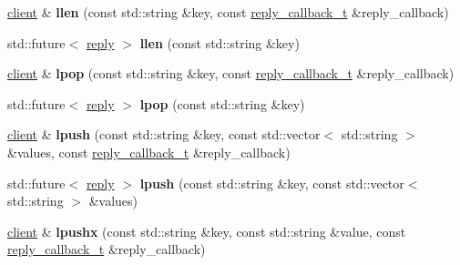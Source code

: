 \begin{DoxyCompactItemize}
\item 
\mbox{\label{classcpp__redis_1_1client_a2e0a911a6bb87224896b7c33da7ac058}} 
\hyperlink{classcpp__redis_1_1client}{client} \& {\bfseries llen} (const std\+::string \&key, const \hyperlink{classcpp__redis_1_1client_a061a1140d36d2eaeda82b09a0bb3f9f2}{reply\+\_\+callback\+\_\+t} \&reply\+\_\+callback)
\item 
\mbox{\label{classcpp__redis_1_1client_a2890fccb9efd08b38195c8fb5fd1651e}} 
std\+::future$<$ \hyperlink{classcpp__redis_1_1reply}{reply} $>$ {\bfseries llen} (const std\+::string \&key)
\item 
\mbox{\label{classcpp__redis_1_1client_ad4060807b9b9aa330ad11dedd69e80b8}} 
\hyperlink{classcpp__redis_1_1client}{client} \& {\bfseries lpop} (const std\+::string \&key, const \hyperlink{classcpp__redis_1_1client_a061a1140d36d2eaeda82b09a0bb3f9f2}{reply\+\_\+callback\+\_\+t} \&reply\+\_\+callback)
\item 
\mbox{\label{classcpp__redis_1_1client_ab6ebbc7b2e6f43f2b5607a4b5471694e}} 
std\+::future$<$ \hyperlink{classcpp__redis_1_1reply}{reply} $>$ {\bfseries lpop} (const std\+::string \&key)
\item 
\mbox{\label{classcpp__redis_1_1client_a0dd04ea38709dd51ae5f39de62d01c70}} 
\hyperlink{classcpp__redis_1_1client}{client} \& {\bfseries lpush} (const std\+::string \&key, const std\+::vector$<$ std\+::string $>$ \&values, const \hyperlink{classcpp__redis_1_1client_a061a1140d36d2eaeda82b09a0bb3f9f2}{reply\+\_\+callback\+\_\+t} \&reply\+\_\+callback)
\item 
\mbox{\label{classcpp__redis_1_1client_ac5859a6b63200a4a79574187a7155feb}} 
std\+::future$<$ \hyperlink{classcpp__redis_1_1reply}{reply} $>$ {\bfseries lpush} (const std\+::string \&key, const std\+::vector$<$ std\+::string $>$ \&values)
\item 
\mbox{\label{classcpp__redis_1_1client_ab0a9a2b92f53f774ce4e345b42a403d0}} 
\hyperlink{classcpp__redis_1_1client}{client} \& {\bfseries lpushx} (const std\+::string \&key, const std\+::string \&value, const \hyperlink{classcpp__redis_1_1client_a061a1140d36d2eaeda82b09a0bb3f9f2}{reply\+\_\+callback\+\_\+t} \&reply\+\_\+callback)

\end{DoxyCompactItemize}
